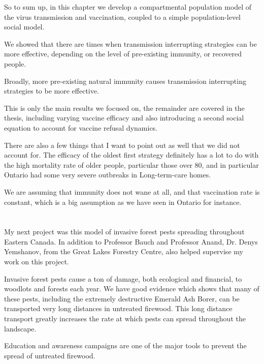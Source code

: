 \documentclass{article}
\begin{document}
So to sum up, in this chapter we develop a compartmental population model of the virus transmission and vaccination, coupled to a simple population-level social model. 


We showed that there are times when transmission interrupting strategies can be more effective, depending on the level of pre-existing immunity, or recovered people. 

Broadly, more pre-existing natural immunity causes transmission interrupting strategies to be more effective.

This is only the main results we focused on, the remainder are covered in the thesis, including varying vaccine efficacy and also introducing a second social equation to account for vaccine refusal dynamics.

There are also a few things that I want to point out as well that we did not account for. The efficacy of the oldest first strategy definitely has a lot to do with the high mortality rate of older people, particular those over 80, and in particular Ontario had some very severe outbreaks in Long-term-care homes.

We are assuming that immunity does not wane at all, and that vaccination rate is constant, which is a big assumption as we have seen in Ontario for instance.



\section{}

My next project was this model of invasive forest pests spreading throughout Eastern Canada. In addition to Professor Bauch and Professor Anand, Dr. Denys Yemshanov, from the Great Lakes Forestry Centre, also helped supervise my work on this project. 

Invasive forest pests cause a ton of damage, both ecological and financial, to woodlots and forests each year. We have good evidence which shows that many of these pests, including the extremely destructive Emerald Ash Borer, can be transported very long distances in untreated firewood. This long distance transport greatly increases the rate at which pests can spread throughout the landscape.

Education and awareness campaigns are one of the major tools to prevent the spread of untreated firewood. 


\section{}
\end{document}
